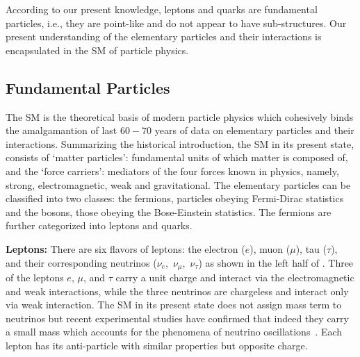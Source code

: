 According to our present knowledge, leptons and quarks are fundamental particles, i.e., they are point-like and do not appear to have 
sub-structures. Our present understanding of the elementary particles and their interactions is encapsulated in the SM of particle physics.

\subsection{Fundamental Particles}
The SM is the theoretical basis of modern particle physics which cohesively binds the amalgamantion of last $60-70$ years of data on
elementary particles and their interactions. Summarizing the historical introduction, the SM in its present state, consists of `matter particles':
 fundamental units of which matter is composed of, and the `force carriers': mediators of the four forces known in physics, namely, strong, 
electromagnetic, weak and gravitational. The elementary particles can be classified into two classes: the fermions, particles obeying Fermi-Dirac 
statistics and the bosons, those obeying the Bose-Einstein statistics. The fermions are further categorized into leptons and quarks.

{\bf Leptons:} There are six flavors of leptons: the electron ($e$), muon ($\mu$), tau ($\tau$), and their corresponding neutrinos
($\nu_{e},$ $\nu_{\mu},$ $\nu_{\tau}$) as shown in the left half of \tab{\ref{Table:SMparticles}}. Three of the leptons $e$, $\mu$, and $\tau$ 
carry a unit charge and interact via the electromagnetic and weak interactions, while the three neutrinos are chargeless and interact only 
via weak interaction. The SM in its present state does not assign mass term to neutrinos but recent experimental studies have confirmed that 
indeed they carry a small mass which accounts for the phenomena of neutrino 
oscillations~\cite{Fukuda:1998mi,Fukuda:2001nk,Ahmad:2002jz,Araki:2004mb,Aliu:2004sq,Michael:2006rx}. Each lepton has its anti-particle with similar 
properties but opposite charge. 

